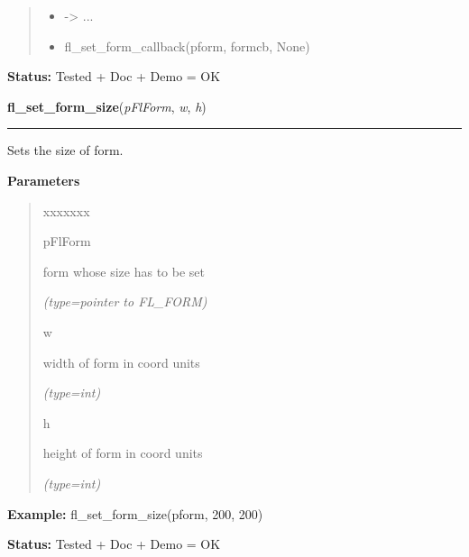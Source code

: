 \begin{boxedminipage}{\funcwidth}
\begin{quote}
\begin{itemize}
  \item {\textbar}-{\textgreater}{\textbar} ...



  \item fl\_set\_form\_callback(pform, formcb, None)



\end{itemize}

\end{quote}

\textbf{Status:} Tested + Doc + Demo = OK



    \end{boxedminipage}

    \label{xformslib:flbasic:fl_set_form_size}

    \vspace{0.5ex}

\hspace{.8\funcindent}\begin{boxedminipage}{\funcwidth}

    \raggedright \textbf{fl\_set\_form\_size}(\textit{pFlForm}, \textit{w}, \textit{h})

    \vspace{-1.5ex}

    \rule{\textwidth}{0.5\fboxrule}
\setlength{\parskip}{2ex}
    Sets the size of form.

\setlength{\parskip}{1ex}
      \textbf{Parameters}
      \vspace{-1ex}

      \begin{quote}
        \begin{Ventry}{xxxxxxx}

          \item[pFlForm]

          form whose size has to be set

            {\it (type=pointer to FL\_FORM)}

          \item[w]

          width of form in coord units

            {\it (type=int)}

          \item[h]

          height of form in coord units

            {\it (type=int)}

        \end{Ventry}

      \end{quote}

\textbf{Example:} fl\_set\_form\_size(pform, 200, 200)



\textbf{Status:} Tested + Doc + Demo = OK



    \end{boxedminipage}

